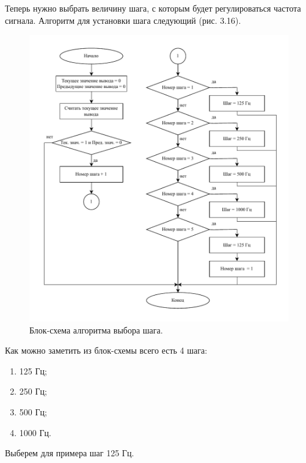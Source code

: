 	Теперь нужно выбрать величину шага, с которым будет регулироваться частота сигнала. Алгоритм для установки шага следующий (рис. 3.16).
	
	\begin{figure}[H]
    \centering
    \includegraphics[width=1\textwidth]{../image/step_select.pdf}
    \caption{Блок-схема алгоритма выбора шага.}
	\end{figure}	
	
	Как можно заметить из блок-схемы всего есть 4 шага:
	\begin{enumerate}
		\item 125 Гц;
		\item 250 Гц;
		\item 500 Гц;
		\item 1000 Гц.
	\end{enumerate}
	
	Выберем для примера шаг 125 Гц.
	
